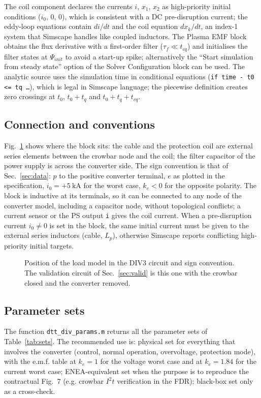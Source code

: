 \documentclass[11pt,a4paper]{article}
\newcommand{\code}[1]{\texttt{#1}}
\begin{document}
The coil component declares the currents $i$, $x_1$, $x_2$ as high-priority initial conditions ($i_0$, 0, 0), which is consistent with a DC pre-disruption current; the eddy-loop equations contain $di/dt$ and the coil equation $dx_k/dt$, an index-1 system that Simscape handles like coupled inductors. The Plasma EMF block obtains the flux derivative with a first-order filter ($\tau_f \ll t_{cq}$) and initialises the filter states at $\Psi_{init}$ to avoid a start-up spike; alternatively the ``Start simulation from steady state'' option of the Solver Configuration block can be used. The analytic source uses the simulation time in conditional equations (\code{if time - t0 <= tq \dots}), which is legal in Simscape language; the piecewise definition creates zero crossings at $t_0$, $t_0 + t_q$ and $t_0 + t_q + t_{cq}$.

\subsection{Connection and conventions}
Fig.~\ref{fig:usage} shows where the block sits: the cable and the protection coil are external series elements between the crowbar node and the coil; the filter capacitor of the power supply is across the converter side. The sign convention is that of Sec.~\ref{sec:data}: $p$ to the positive converter terminal, $e$ as plotted in the specification, $i_0 = +\SI{5}{\kilo\ampere}$ for the worst case, $k_e < 0$ for the opposite polarity. The block is inductive at its terminals, so it can be connected to any node of the converter model, including a capacitor node, without topological conflicts; a current sensor or the PS output \code{i} gives the coil current. When a pre-disruption current $i_0 \neq 0$ is set in the block, the same initial current must be given to the external series inductors (cable, $L_p$), otherwise Simscape reports conflicting high-priority initial targets.

\begin{figure}[htbp]
\centering

\caption{Position of the load model in the DIV3 circuit and sign convention. The validation circuit of Sec.~\ref{sec:valid} is this one with the crowbar closed and the converter removed.}
\label{fig:usage}
\end{figure}

\subsection{Parameter sets}
\label{sec:params}
The function \code{dtt\_div\_params.m} returns all the parameter sets of Table~\ref{tab:sets}. The recommended use is: physical set for everything that involves the converter (control, normal operation, overvoltage, protection mode), with the e.m.f. table at $k_e = 1$ for the voltage worst case and at $k_e = 1.84$ for the current worst case; ENEA-equivalent set when the purpose is to reproduce the contractual Fig.~7 (e.g. crowbar $I^2t$ verification in the FDR); black-box set only as a cross-check.
\end{document}
